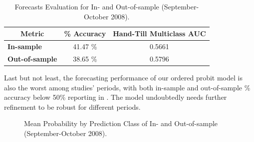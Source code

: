 \begin{table}[H]
\centering
\begin{tabular}{@{}lcc@{}}
\toprule
\multicolumn{1}{c}{Metric} & \multicolumn{1}{l}{\textbf{\% Accuracy}} & \multicolumn{1}{l}{\textbf{Hand-Till Multiclass AUC}} \\ \midrule
\textbf{In-sample}         & 41.47 \%                                 & 0.5661                                                \\
\textbf{Out-of-sample}     & 38.65 \%                                 & 0.5796                                                \\ \bottomrule
\end{tabular}
\caption{Forecasts Evaluation for In- and Out-of-sample (September-October 2008).}
\label{tab:table-29}
\end{table}

Last but not least, the forecasting performance of our ordered probit model is also the worst among studies' periods, with both in-sample and out-of-sample \% accuracy below 50\% reporting in . The model undoubtedly needs further refinement to be robust for different periods.






\begin{figure}[H]
    \centering
    \caption{Mean Probability by Prediction Class of In- and Out-of-sample (September-October 2008).}
    \label{fig:figure-7}
\end{figure}
